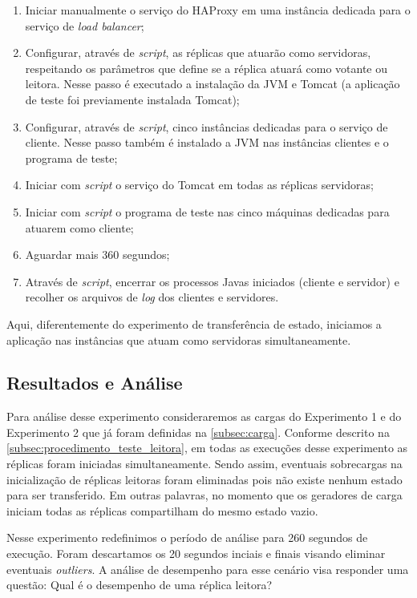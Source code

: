 \begin{enumerate}
  \item Iniciar manualmente o serviço do HAProxy em uma instância dedicada para o serviço
    de \emph{load balancer};
  \item Configurar, através de \emph{script}, as réplicas que atuarão como servidoras,
    respeitando os parâmetros que define se a réplica atuará como votante ou leitora.
    Nesse passo é executado a instalação da JVM e Tomcat (a aplicação de teste foi
    previamente instalada Tomcat);
  \item Configurar, através de \emph{script}, cinco instâncias dedicadas para o serviço de
    cliente. Nesse passo também é instalado a JVM nas instâncias clientes e o programa de
    teste;
  \item Iniciar com \emph{script} o serviço do Tomcat em todas as réplicas servidoras;
  \item Iniciar com \emph{script} o programa de teste nas cinco máquinas dedicadas para
    atuarem como cliente;
  \item Aguardar mais 360 segundos;
  \item Através de \emph{script}, encerrar os processos Javas iniciados (cliente e
    servidor) e recolher os arquivos de \emph{log} dos clientes e servidores.
\end{enumerate}

Aqui, diferentemente do experimento de transferência de estado, iniciamos a aplicação nas
instâncias que atuam como servidoras simultaneamente.

\subsection{Resultados e Análise}

Para análise desse experimento consideraremos as cargas do Experimento 1 e do Experimento
2 que já foram definidas na \autoref{subsec:carga}. Conforme descrito na
\autoref{subsec:procedimento_teste_leitora}, em todas as execuções desse experimento as
réplicas foram iniciadas simultaneamente. Sendo assim, eventuais sobrecargas na
inicialização de réplicas leitoras foram eliminadas pois não existe nenhum estado para ser
transferido. Em outras palavras, no momento que os geradores de carga iniciam todas as
réplicas compartilham do mesmo estado vazio.

Nesse experimento redefinimos o período de análise para 260 segundos de execução. Foram
descartamos os 20 segundos inciais e finais visando eliminar eventuais \emph{outliers}. A
análise de desempenho para esse cenário visa responder uma questão: Qual é o desempenho de
uma réplica leitora?

